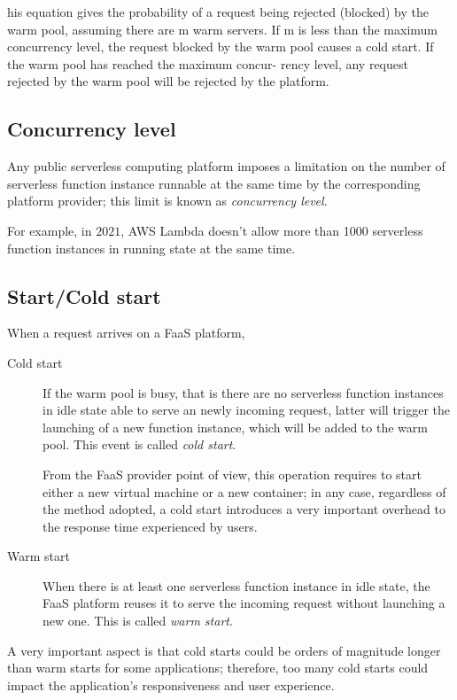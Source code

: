 his equation gives the probability of a request being
rejected (blocked) by the warm pool, assuming there are m
warm servers. If m is less than the maximum concurrency
level, the request blocked by the warm pool causes a cold
start. If the warm pool has reached the maximum concur-
rency level, any request rejected by the warm pool will be
rejected by the platform.

\subsection{Concurrency level}

Any public serverless computing platform imposes a limitation on the number of serverless function instance runnable at the same time by the corresponding platform provider; this limit is known as \textit{concurrency level}.

For example, in $2021$, AWS Lambda doesn't allow more than 1000 serverless function instances in running state at the same time.

\subsection{Start/Cold start}

When a request arrives on a FaaS platform, 

\begin{description}
	\item[Cold start] If the warm pool is busy, that is there are no serverless function instances in idle state able to serve an newly incoming request, latter will trigger the launching of a new function instance, which will be added to the warm pool. This event is called \textit{cold start}.
		
	From the FaaS provider point of view, this operation requires to start either a new virtual	machine or a new container; in any case, regardless of the method adopted, a cold start introduces a very important overhead to the response time experienced by users. 
	
	\item[Warm start] When there is at least one serverless function instance in idle state, the FaaS platform reuses it to serve the incoming request without launching a new one. This is called \textit{warm start}.
\end{description}  

A very important aspect is that cold starts could be orders of magnitude longer than warm starts for some applications; therefore, too many cold starts could impact the application’s responsiveness and user experience.

